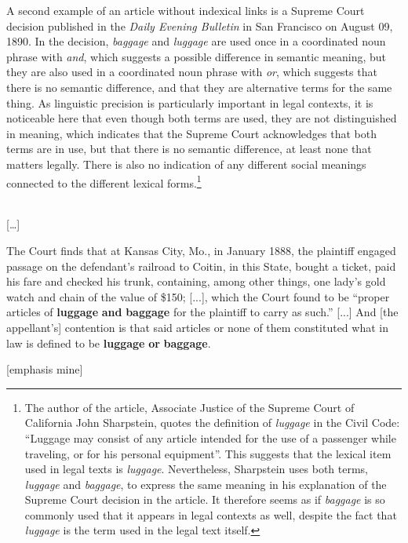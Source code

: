 A second example of an article without indexical links is a Supreme Court decision published in the \emph{Daily Evening Bulletin} in San Francisco on August 09, 1890. In the decision, \emph{baggage} and \emph{luggage} are used once in a coordinated noun phrase with \emph{and}, which suggests a possible difference in semantic meaning, but they are also used in a coordinated noun phrase with \emph{or}, which suggests that there is no semantic difference, and that they are alternative terms for the same thing. As linguistic precision is particularly important in legal contexts, it is noticeable here that even though both terms are used, they are not distinguished in meaning, which indicates that the Supreme Court acknowledges that both terms are in use, but that there is no semantic difference, at least none that matters legally. There is also no indication of any different social meanings connected to the different lexical forms.\footnote{The author of the article, Associate Justice of the Supreme Court of California John Sharpstein, quotes the definition of \textit{luggage} in the Civil Code: “Luggage may consist of any article intended for the use of a passenger while traveling, or for his personal equipment”. This suggests that the lexical item used in legal texts is \textit{luggage}. Nevertheless, Sharpstein uses both terms, \textit{luggage} and \textit{baggage}, to express the same meaning in his explanation of the Supreme Court decision in the article. It therefore seems as if \textit{baggage} is so commonly used that it appears in legal contexts as well, despite the fact that \textit{luggage} is the term used in the legal text itself.}

\begin{ipquote}
\begin{center}
\\
{[…]}
\end{center}
{The Court finds that at Kansas City, Mo., in January 1888, the plaintiff engaged passage on the defendant's railroad to Coitin, in this State, bought a ticket, paid his fare and checked his trunk, containing, among other things, one lady's gold watch and chain of the value of \$150; [...], which the Court found to be “proper articles of \textbf{luggage} \textbf{and} \textbf{baggage} for the plaintiff to carry as such.” [...] And [the appellant's] contention is that said articles or none of them constituted what in law is defined to be \textbf{luggage} \textbf{or} \textbf{baggage}.

\raggedleft
{[emphasis mine]}\\
}
\end{ipquote}


